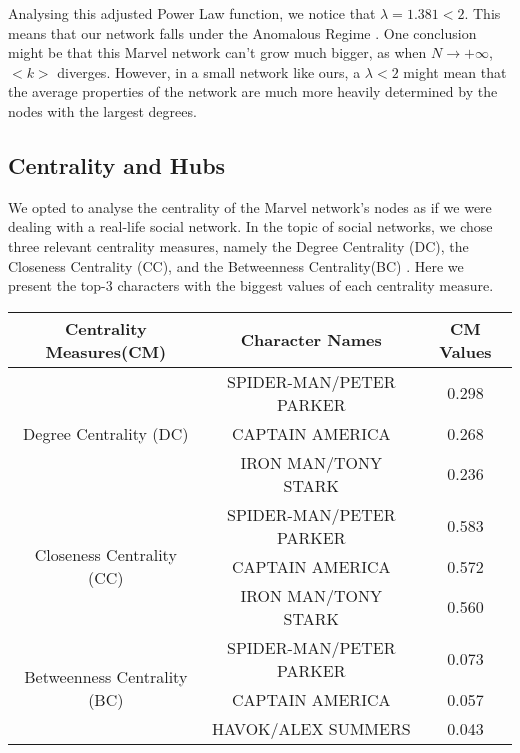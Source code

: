 \documentclass[a4paper]{article}
\begin{document}
Analysing this adjusted Power Law function, we notice that  $\lambda = 1.381 < 2$. This means that our network falls under the Anomalous Regime \cite{Network Science}. One conclusion might be that this Marvel network can't grow much bigger, as when $N \rightarrow +\infty$, $<k>$ diverges. However, in a small network like ours, a $\lambda < 2$ might mean that the average properties of the network are much more heavily determined by the nodes with the largest degrees\cite{cond-mat}. 


\subsection{Centrality and Hubs}
We opted to analyse the centrality of the Marvel network's nodes as if we were dealing with a real-life social network. In the topic of social networks, we chose three relevant centrality measures, namely the Degree Centrality (DC), the Closeness Centrality (CC), and the Betweenness Centrality(BC) \cite{cent_meas}. Here we present the top-3 characters with the biggest values of each centrality measure.

\bigskip

\begin{center}
\setlength{\tabcolsep}{10pt} %
\renewcommand{\arraystretch}{1.2} %
\begin{tabular}{ |c|c|c| } 
\hline
{Centrality Measures(CM)}
& Character Names & CM Values\\
\hline
\multirow{3}{*}{Degree Centrality (DC)}
& SPIDER-MAN/PETER PARKER & 0.298 \\
& CAPTAIN AMERICA & 0.268 \\
& IRON MAN/TONY STARK & 0.236\\

\hline
\multirow{3}{*}{Closeness Centrality (CC)}
& SPIDER-MAN/PETER PARKER & 0.583 \\
& CAPTAIN AMERICA & 0.572 \\
& IRON MAN/TONY STARK & 0.560\\
\hline
\multirow{3}{*}{Betweenness Centrality (BC)}
& SPIDER-MAN/PETER PARKER & 0.073 \\
& CAPTAIN AMERICA & 0.057 \\
& HAVOK/ALEX SUMMERS & 0.043\\

\hline
\end{tabular}
\end{center}


\bigskip
\end{document}
